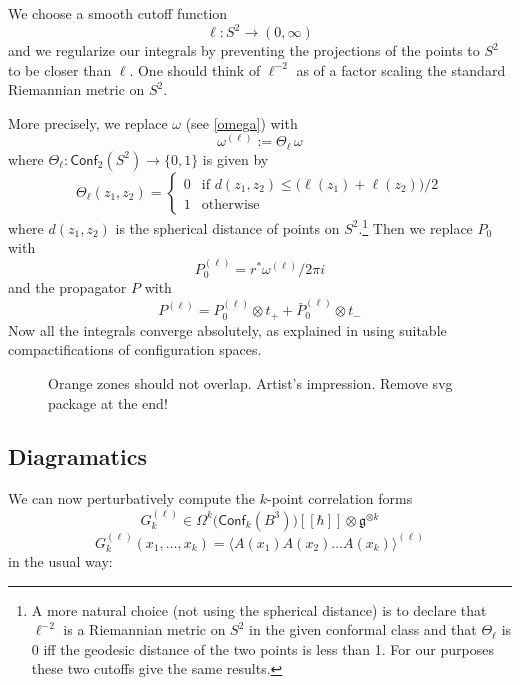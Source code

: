\documentclass[a4paper]{amsart}
\theoremstyle{plain}
\theoremstyle{definition}
\newcommand{\g}{\mathfrak{g}}
\newcommand{\la}{\langle}
\newcommand{\ra}{\rangle}
\newcommand{\cf}{\mathsf{Conf}}
\begin{document}
We choose a smooth cutoff function
$$\ell\colon S^2\to(0,\infty)$$ and  we regularize our integrals by preventing the projections of the points to $S^2$ to be closer than $\ell$. One should think of $\ell^{-2}$ as of a factor scaling the standard Riemannian metric on $S^2$. 

More precisely, we replace $\omega$ (see \eqref{omega}) with
$$\omega^{(\ell)}:=\Theta_\ell\, \omega$$
where $\Theta_\ell\colon\cf_2(S^2)\to\{0,1\}$ is given by
$$
\Theta_\ell(z_1,z_2)=
\begin{cases}
0 & \text{if } d(z_1,z_2)\leq \bigl(\ell(z_1)+\ell(z_2)\bigr)/2\\
1 & \text{otherwise}
\end{cases}
$$
where $d(z_1,z_2)$ is the spherical distance of points on $S^2$.\footnote{%
A more natural choice (not using the spherical distance) is to declare that $\ell^{-2}$ is a Riemannian metric on $S^2$ in the given conformal class and that $\Theta_\ell$ is 0 iff the geodesic distance of the two points is less than 1. For our purposes these two cutoffs give the same results.}
Then we replace $P_0$ with
$$P_0^{(\ell)}=r^*\omega^{(\ell)}/2\pi i$$
and the propagator $P$ with
$$P^{(\ell)}=P_0^{(\ell)}\otimes t_+ + \bar P_0^{(\ell)}\otimes t_-$$
 Now all the integrals converge absolutely, as explained in \cite{AS,K} using suitable compactifications of configuration spaces.

\begin{figure}[h]
	
	\caption{ {\color{teal} Orange zones should not overlap. Artist's impression. Remove svg package at the end!}}
\end{figure}

\subsection{Diagramatics}


We can now perturbatively compute the $k$-point correlation forms%
$$G_k^{(\ell)}\in\Omega^k\bigl(\cf_k(B^3)\bigr)[\![\hbar]\!]\otimes\g^{\otimes k}$$
$$G_k^{(\ell)}(x_1,\dots,x_k)=\bigl\la A(x_1)A(x_2)\dots A(x_k)\bigr\ra^{(\ell)}$$
in the usual way:
\end{document}
